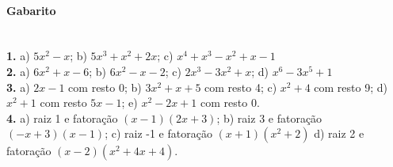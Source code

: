 \documentclass[a4paper,12pt]{article}
\begin{document}
\begin{multicols}{2}
\vspace*{5cm}
\end{multicols}
 
\vspace*{\fill}
{\footnotesize
\paragraph*{Gabarito} \hspace*{\fill}\\
\textbf{1.} a) $5x^2 - x$; b) $5x^3 + x^2 + 2x$; c) $x^4 + x^3 - x^2 + x - 1$\\
\textbf{2.} a) $6x^2 + x - 6$; b) $6x^2 - x - 2$; c) $2x^3 - 3x^2 + x$; d) $x^6 - 3x^5 + 1$ \\
\textbf{3.} a) $2x - 1$ com resto 0; b) $3x^2 + x + 5$ com resto 4; c) $x^2 + 4$ com resto 9; d) $x^2  + 1$ com resto $5x-1$; e) $x^2-2x+1$ com resto 0.\\
\textbf{4.} a) raiz 1 e fatoração $(x-1)(2x+3)$; b) raiz 3 e fatoração $(-x+3)(x-1)$; c) raiz -1 e fatoração $(x+1)(x^2+2)$ d) raiz 2 e fatoração $(x-2)(x^2+4x+4)$.
}
\end{document}
